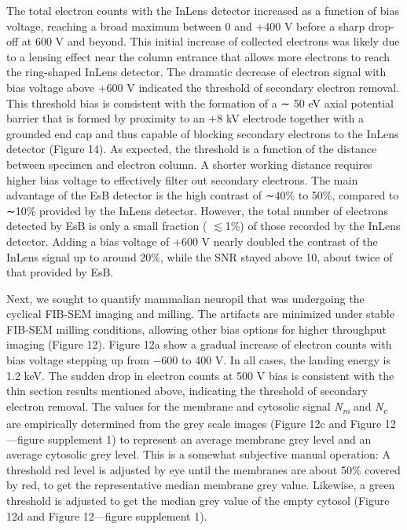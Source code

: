 \documentclass{article}
\begin{document}
The total electron counts with the InLens detector increased as a function of bias voltage, reaching a broad maximum between 0 and +400 V before a sharp drop-off at 600 V and beyond. This initial increase of collected electrons was likely due to a lensing effect near the column entrance that allows more electrons to reach the ring-shaped InLens detector. The dramatic decrease of electron signal with bias voltage above +600 V indicated the threshold of secondary electron removal. This threshold bias is consistent with the formation of a ∼ 50 eV axial potential barrier that is formed by proximity to an +8 kV electrode together with a grounded end cap and thus capable of blocking secondary electrons to the InLens detector (Figure 14). As expected, the threshold is a function of the distance between specimen and electron column. A shorter working distance requires higher bias voltage to effectively filter out secondary electrons. The main advantage of the EsB detector is the high contrast of ∼40\% to 50\%, compared to ∼10\% provided by the InLens detector. However, the total number of electrons detected by EsB is only a small fraction ( $\lesssim$1\%) of those recorded by the InLens detector. Adding a bias voltage of +600 V nearly doubled the contrast of the InLens signal up to around 20\%, while the SNR stayed above 10, about twice of that provided by EsB.

Next, we sought to quantify mammalian neuropil that was undergoing the cyclical FIB-SEM imaging and milling. The artifacts are minimized under stable FIB-SEM milling conditions, allowing other bias options for higher throughput imaging (Figure 12). Figure 12a show a gradual increase of electron counts with bias voltage stepping up from −600 to 400 V. In all cases, the landing energy is 1.2 keV. The sudden drop in electron counts at 500 V bias is consistent with the thin section results mentioned above, indicating the threshold of secondary electron removal. The values for the membrane and cytosolic signal \emph{N\textsubscript{m}} and \emph{N\textsubscript{c}} are empirically determined from the grey scale images (Figure 12c and Figure 12—figure supplement 1) to represent an average membrane grey level and an average cytosolic grey level. This is a somewhat subjective manual operation: A threshold red level is adjusted by eye until the membranes are about 50\% covered by red, to get the representative median membrane grey value. Likewise, a green threshold is adjusted to get the median grey value of the empty cytosol (Figure 12d and Figure 12—figure supplement 1).
\end{document}

